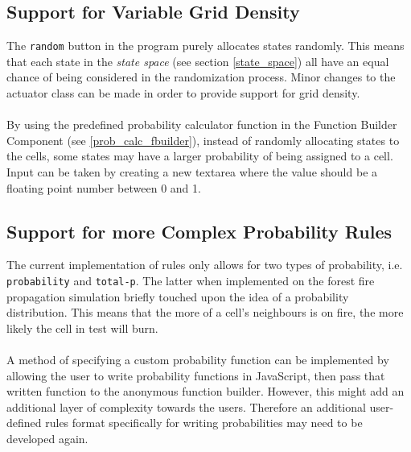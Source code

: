 \subsection{Support for Variable Grid Density}
The \texttt{random} button in the program purely allocates states randomly. This means that each state in the \textit{state space} (see section \ref{state_space}) all have an equal chance of being considered in the randomization process. Minor changes to the actuator class can be made in order to provide support for grid density. 
\\ \\
By using the predefined probability calculator function in the Function Builder Component (see \ref{prob_calc_fbuilder}), instead of randomly allocating states to the cells, some states may have a larger probability of being assigned to a cell. Input can be taken by creating a new textarea where the value should be a floating point number between 0 and 1.

\subsection{Support for more Complex Probability Rules}
The current implementation of rules only allows for two types of probability, i.e. \texttt{probability} and \texttt{total-p}. The latter when implemented on the forest fire propagation simulation briefly touched upon the idea of a probability distribution. This means that the more of a cell's neighbours is on fire, the more likely the cell in test will burn. 
\\ \\
A method of specifying a custom probability function can be implemented by allowing the user to write probability functions in JavaScript, then pass that written function to the anonymous function builder. However, this might add an additional layer of complexity towards the users. Therefore an additional user-defined rules format specifically for writing probabilities may need to be developed again. 

\newpage
